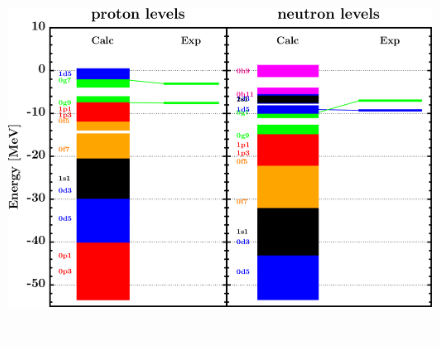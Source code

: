 \documentclass[twocolumn,secnumarabic,amssymb, nobibnotes, aps, prl,
superscriptaddress, nobalancelastpage]{revtex4}
\begin{document}
\begin{figure}[!htb]
\begin{minipage}{0.4\linewidth}
        \label{DOM_sn112_chargeDensity}
    \end{minipage}
    \begin{minipage}{0.35\linewidth}
        \centering
        \includegraphics[width=\linewidth]{figures/sn112_SPLevels.png}
        \label{DOM_sn112_SPLevels}
    \end{minipage}
    \begin{minipage}{0.4\linewidth}
        \centering
        \includegraphics[width=\linewidth]{figures/sn112_RMSRadius.png}

\end{minipage}
\end{figure}
\end{document}
